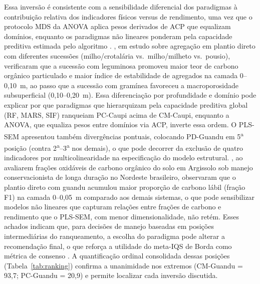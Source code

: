 \documentclass[pdflatex,sn-basic]{sn-jnl}%
\begin{document}
Essa inversão é consistente com a sensibilidade diferencial dos paradigmas à contribuição relativa dos indicadores físicos versus de rendimento, uma vez que o protocolo MDS da ANOVA aplica pesos derivados de ACP que equalizam domínios, enquanto os paradigmas não lineares ponderam pela capacidade preditiva estimada pelo algoritmo \cite{Chaudhry2024}. \cite{Fernandes2022}, em estudo sobre agregação em plantio direto com diferentes sucessões (milho/crotalária vs.\ milho/milheto vs.\ pousio), verificaram que a sucessão com leguminosa promoveu maior teor de carbono orgânico particulado e maior índice de estabilidade de agregados na camada 0--0,10~m, ao passo que a sucessão com gramínea favoreceu a macroporosidade subsuperficial (0,10--0,20~m). Essa diferenciação por profundidade e domínio pode explicar por que paradigmas que hierarquizam pela capacidade preditiva global (RF, MARS, SIF) ranqueiam PC-Caupi acima de CM-Caupi, enquanto a ANOVA, que equaliza pesos entre domínios via ACP, inverte essa ordem. O PLS-SEM apresentou também divergências pontuais, colocando PD-Guandu em 5\textsuperscript{a} posição (contra 2\textsuperscript{a}--3\textsuperscript{a} nos demais), o que pode decorrer da exclusão de quatro indicadores por multicolinearidade na especificação do modelo estrutural. \cite{OliveiraFCC2024}, ao avaliarem frações oxidáveis de carbono orgânico do solo em Argissolo sob manejo conservacionista de longa duração no Nordeste brasileiro, observaram que o plantio direto com guandu acumulou maior proporção de carbono lábil (fração F1) na camada 0--0,05~m comparado aos demais sistemas, o que pode sensibilizar modelos não lineares que capturam relações entre frações de carbono e rendimento que o PLS-SEM, com menor dimensionalidade, não retém. Esses achados indicam que, para decisões de manejo baseadas em posições intermediárias do ranqueamento, a escolha do paradigma pode alterar a recomendação final, o que reforça a utilidade do meta-IQS de Borda como métrica de consenso \cite{Lin2010}. A quantificação ordinal consolidada dessas posições (Tabela~\ref{tab:ranking}) confirma a unanimidade nos extremos (CM-Guandu = 93,7; PC-Guandu = 20,9) e permite localizar cada inversão discutida.
\end{document}
